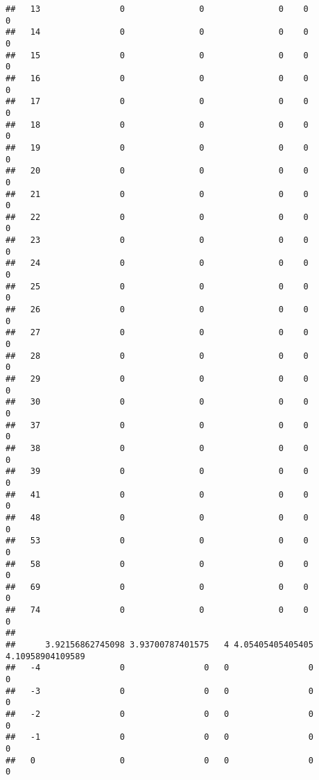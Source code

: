 \documentclass[]{article}
\begin{document}
\begin{verbatim}
##   13                0               0               0    0                0
##   14                0               0               0    0                0
##   15                0               0               0    0                0
##   16                0               0               0    0                0
##   17                0               0               0    0                0
##   18                0               0               0    0                0
##   19                0               0               0    0                0
##   20                0               0               0    0                0
##   21                0               0               0    0                0
##   22                0               0               0    0                0
##   23                0               0               0    0                0
##   24                0               0               0    0                0
##   25                0               0               0    0                0
##   26                0               0               0    0                0
##   27                0               0               0    0                0
##   28                0               0               0    0                0
##   29                0               0               0    0                0
##   30                0               0               0    0                0
##   37                0               0               0    0                0
##   38                0               0               0    0                0
##   39                0               0               0    0                0
##   41                0               0               0    0                0
##   48                0               0               0    0                0
##   53                0               0               0    0                0
##   58                0               0               0    0                0
##   69                0               0               0    0                0
##   74                0               0               0    0                0
##     
##      3.92156862745098 3.93700787401575   4 4.05405405405405 4.10958904109589
##   -4                0                0   0                0                0
##   -3                0                0   0                0                0
##   -2                0                0   0                0                0
##   -1                0                0   0                0                0
##   0                 0                0   0                0                0

\end{verbatim}
\end{document}
